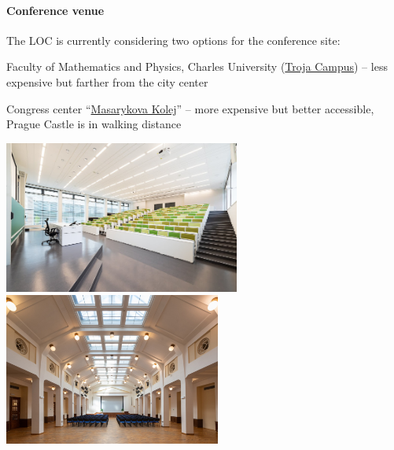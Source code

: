 \documentclass[12pt]{extarticle}
\newcommand*\sq{\mathbin{\vcenter{\hbox{\rule{.8ex}{.8ex}}}}}
\newenvironment{t_sq_itemize}
{\begin{itemize}[topsep=0pt, parsep=0pt, itemsep=0pt, leftmargin=*]
    \renewcommand{\labelitemi}{{\(\sq\)}}}
  {\end{itemize}}
\begin{document}
\paragraph{Conference venue} The LOC is currently considering two
options for the conference site:
\begin{t_sq_itemize}
\item
  Faculty of Mathematics and Physics, Charles University
  (\href{https://maps.app.goo.gl/YLm43Nb5XHHziMX16}{Troja Campus})
  -- less expensive but farther from the city center
  \item Congress center ``\href{https://www.masarykovakolej.cz/en/im-organizing-event}{Masarykova Kolej}'' -- more expensive but better
    accessible, Prague Castle is in walking distance
  \end{t_sq_itemize}
  \begin{center}
    \includegraphics[height=5cm]{Impakt-troja_1}
    \hspace{7mm}
    \includegraphics[height=5cm]{MK}\\[-1.5mm]
    \hspace{3mm}{\small Troja Campus}\hspace{5.4cm}{\small Masarykova Kolej}
  \end{center}
\end{document}
